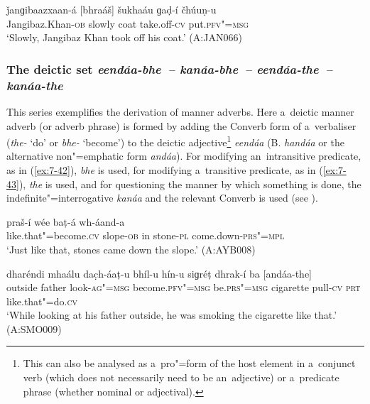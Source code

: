 \begin{exe}
\ex
\label{ex:7-41}
\gll ǰanɡibaazxaan-á [bhraáš] šukhaáu ɡaḍ-í čhúuṇ-u \\
Jangibaz.Khan-\textsc{ob} slowly coat take.off-\textsc{cv} put.\textsc{pfv"=msg}  \\
\glt `Slowly, Jangibaz Khan took off his coat.' (A:JAN066)
\end{exe}

\subsubsection*{The deictic set \textit{eendáa-bhe~-- kanáa-bhe~-- eendáa-the~--
    kanáa-the}}

This series exemplifies the derivation of manner adverbs. Here a~deictic manner adverb (or adverb
phrase) is formed by adding the Converb form of a~verbaliser (\textit{the-} `do' or \textit{bhe-}
`become') to the deictic adjective\footnote{This can also be analysed as a~pro"=form of the host
  element in a~conjunct verb (which does not necessarily need to be an~adjective) or a~predicate
  phrase (whether nominal or adjectival).} \textit{eendáa} (B. \textit{handáa} or the alternative
non"=emphatic form \textit{andáa}). For modifying an~intransitive predicate, as in (\ref{ex:7-42}),
\textit{bhe} is used, for modifying a~transitive predicate, as in (\ref{ex:7-43}), \textit{the} is
used, and for questioning the manner by which something is done, the indefinite"=interrogative
\textit{kanáa} and the relevant Converb is used (see ).

\begin{exe}
\ex
\label{ex:7-42}
 praš-í wée baṭ-á wh-áand-a \\
like.that"=become.\textsc{cv} slope-\textsc{ob} in stone-\textsc{pl} come.down-\textsc{prs"=mpl} \\
\glt `Just like that, stones came down the slope.' (A:AYB008)
\end{exe}
\begin{exe}
\ex
\label{ex:7-43}
\gll dharéndi mhaálu dac̣h-áaṭ-u bhíl-u hín-u  siɡréṭ dhrak-í ba
     [andáa-the] \\
outside father look-\textsc{ag"=msg} become.\textsc{pfv"=msg} be.\textsc{prs"=msg} cigarette pull-\textsc{cv} \textsc{prt} like.that"=do.\textsc{cv}  \\
\glt `While looking at his father outside, he was smoking the cigarette like that.' (A:SMO009)
\end{exe}

